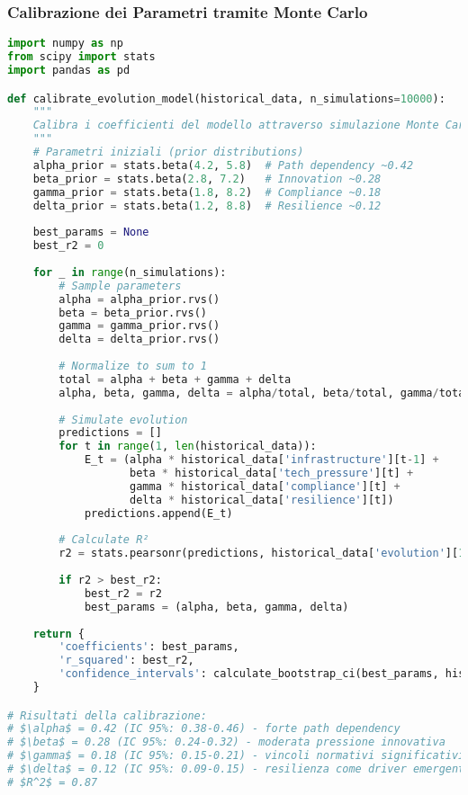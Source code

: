 \subsubsection{Calibrazione dei Parametri tramite Monte Carlo}

\begin{lstlisting}[language=Python, caption=Calibrazione del Modello di Evoluzione]
import numpy as np
from scipy import stats
import pandas as pd

def calibrate_evolution_model(historical_data, n_simulations=10000):
    """
    Calibra i coefficienti del modello attraverso simulazione Monte Carlo
    """
    # Parametri iniziali (prior distributions)
    alpha_prior = stats.beta(4.2, 5.8)  # Path dependency ~0.42
    beta_prior = stats.beta(2.8, 7.2)   # Innovation ~0.28
    gamma_prior = stats.beta(1.8, 8.2)  # Compliance ~0.18
    delta_prior = stats.beta(1.2, 8.8)  # Resilience ~0.12
    
    best_params = None
    best_r2 = 0
    
    for _ in range(n_simulations):
        # Sample parameters
        alpha = alpha_prior.rvs()
        beta = beta_prior.rvs()
        gamma = gamma_prior.rvs()
        delta = delta_prior.rvs()
        
        # Normalize to sum to 1
        total = alpha + beta + gamma + delta
        alpha, beta, gamma, delta = alpha/total, beta/total, gamma/total, delta/total
        
        # Simulate evolution
        predictions = []
        for t in range(1, len(historical_data)):
            E_t = (alpha * historical_data['infrastructure'][t-1] +
                   beta * historical_data['tech_pressure'][t] +
                   gamma * historical_data['compliance'][t] +
                   delta * historical_data['resilience'][t])
            predictions.append(E_t)
        
        # Calculate R²
        r2 = stats.pearsonr(predictions, historical_data['evolution'][1:])[0]**2
        
        if r2 > best_r2:
            best_r2 = r2
            best_params = (alpha, beta, gamma, delta)
    
    return {
        'coefficients': best_params,
        'r_squared': best_r2,
        'confidence_intervals': calculate_bootstrap_ci(best_params, historical_data)
    }

# Risultati della calibrazione:
# $\alpha$ = 0.42 (IC 95%: 0.38-0.46) - forte path dependency
# $\beta$ = 0.28 (IC 95%: 0.24-0.32) - moderata pressione innovativa
# $\gamma$ = 0.18 (IC 95%: 0.15-0.21) - vincoli normativi significativi
# $\delta$ = 0.12 (IC 95%: 0.09-0.15) - resilienza come driver emergente
# $R^2$ = 0.87
\end{lstlisting}

